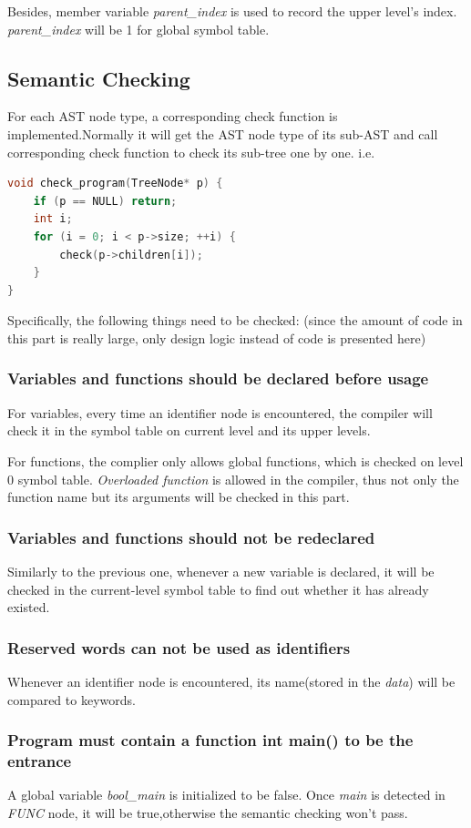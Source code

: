\documentclass{article}
\begin{document}
Besides, member variable \textit{parent\_index} is used to record the upper level's index.  \textit{parent\_index} will be 1 for global symbol table.

\subsection{Semantic Checking}
For each AST node type, a corresponding check function is implemented.Normally it will get the AST node type of its sub-AST and call corresponding check function to check its sub-tree one by one. i.e.
\begin{lstlisting}[language = C] 
void check_program(TreeNode* p) {
	if (p == NULL) return;
	int i;
	for (i = 0; i < p->size; ++i) {
		check(p->children[i]);
	}
}
\end{lstlisting}

Specifically, the following things need to be checked: (since the amount of code in this part is really large, only design logic instead of code is presented here)

\subsubsection{Variables and functions should be declared before usage}
For variables, every time an identifier node is encountered, the compiler will check it in the symbol table on current level and its upper levels.

For functions, the complier only allows global functions, which is checked on level 0 symbol table. \textit{Overloaded function} is allowed in the compiler, thus not only the function name but its arguments will be checked in this part. 

\subsubsection{Variables and functions should not be redeclared}
Similarly to the previous one, whenever a new variable is declared, it will be checked in the current-level symbol table to find out whether it has already existed.

\subsubsection{Reserved words can not be used as identifiers}
Whenever an identifier node is encountered, its name(stored in the \textit{data}) will be compared to keywords.

\subsubsection{Program must contain a function int main() to be the entrance}
A global variable \textit{bool\_main} is initialized to be false. Once \textit{main} is detected in \textit{FUNC} node, it will be true,otherwise the semantic checking won't pass.
\end{document}
